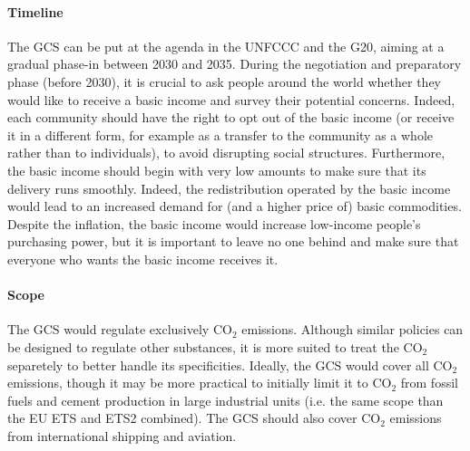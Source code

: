 \documentclass[12pt,english]{article}
\begin{document}
\paragraph{Timeline} 
The GCS can be put at the agenda in the UNFCCC and the G20, aiming at a gradual phase-in between 2030 and 2035. During the negotiation and preparatory phase (before 2030), it is crucial to ask people around the world whether they would like to receive a basic income and survey their potential concerns. Indeed, each community should have the right to opt out of the basic income (or receive it in a different form, for example as a transfer to the community as a whole rather than to individuals), to avoid disrupting social structures. Furthermore, the basic income should begin with very low amounts to make sure that its delivery runs smoothly. Indeed, the redistribution operated by the basic income would lead to an increased demand for (and a higher price of) basic commodities. Despite the inflation, the basic income would increase low-income people's purchasing power, but it is important to leave no one behind and make sure that everyone who wants the basic income receives it. %

\paragraph{Scope} 
The GCS would regulate exclusively CO$_\text{2}$ emissions. Although similar policies can be designed to regulate other substances, it is more suited to treat the CO$_\text{2}$ separetely to better handle its specificities. Ideally, the GCS would cover all CO$_\text{2}$ emissions, though it may be more practical to initially limit it to CO$_\text{2}$ from fossil fuels and cement production in large industrial units (i.e. the same scope than the EU ETS and ETS2 combined). The GCS should also cover CO$_\text{2}$ emissions from international shipping and aviation. 
\end{document}

